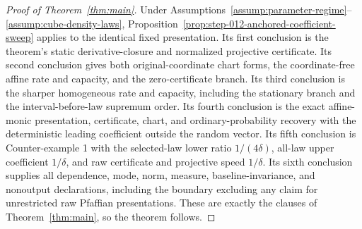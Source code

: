 \begin{proof}[Proof of Theorem~\ref{thm:main}]
Under Assumptions~\ref{assump:parameter-regime}--\ref{assump:cube-density-laws},
Proposition~\ref{prop:step-012-anchored-coefficient-sweep} applies to the
identical fixed presentation.  Its first conclusion is the theorem's static
derivative-closure and normalized projective certificate.  Its second
conclusion gives both original-coordinate chart forms, the coordinate-free
affine rate and capacity, and the zero-certificate branch.  Its third
conclusion is the sharper homogeneous rate and capacity, including the
stationary branch and the interval-before-law supremum order.  Its fourth
conclusion is the exact affine-monic presentation, certificate, chart, and
ordinary-probability recovery with the deterministic leading coefficient
outside the random vector.  Its fifth conclusion is Counter-example 1 with
the selected-law lower ratio $1/(4\delta)$, all-law upper coefficient $1/\delta$,
and raw certificate and projective speed $1/\delta$.  Its sixth conclusion supplies
all dependence, mode, norm, measure, baseline-invariance, and nonoutput
declarations, including the boundary excluding any claim for unrestricted
raw Pfaffian presentations.  These are exactly the clauses of
Theorem~\ref{thm:main}, so the theorem follows.
\end{proof}
